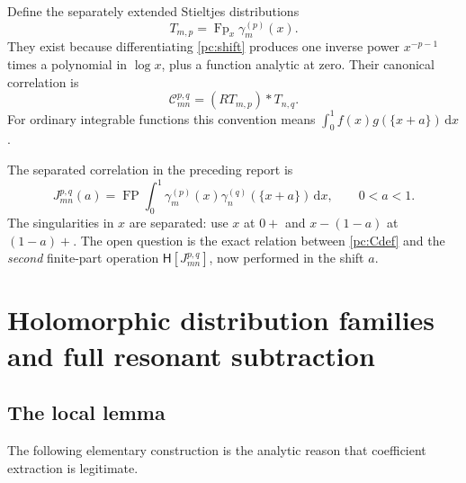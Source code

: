 \documentclass[11pt,a4paper]{article}
\numberwithin{equation}{section}
\theoremstyle{definition}
\newcommand{\dd}{\,\mathrm d}
\newcommand{\FP}{\operatorname{FP}}
\newcommand{\Fp}{\operatorname{Fp}}
\newcommand{\HH}{\mathsf H}
\newcommand{\CC}{\mathcal C}
\begin{document}
Define the separately extended Stieltjes distributions
\begin{equation}\label{pc:Tdef}
T_{m,p}=\Fp_x\gamma_m^{(p)}(x).
\end{equation}
They exist because differentiating \eqref{pc:shift} produces one inverse power $x^{-p-1}$ times a polynomial in $\log x$, plus a function analytic at zero. Their canonical correlation is
\begin{equation}\label{pc:Cdef}
\CC_{mn}^{p,q}=(RT_{m,p})*T_{n,q}.
\end{equation}
For ordinary integrable functions this convention means $\int_0^1f(x)g(\{x+a\})\dd x$.

The separated correlation in the preceding report is
\begin{equation}\label{pc:Jdef}
J_{mn}^{p,q}(a)=\FP\int_0^1
\gamma_m^{(p)}(x)\gamma_n^{(q)}(\{x+a\})\dd x,
\qquad 0<a<1.
\end{equation}
The singularities in $x$ are separated: use $x$ at $0+$ and $x-(1-a)$ at $(1-a)+$. The open question is the exact relation between \eqref{pc:Cdef} and the \emph{second} finite-part operation $\HH[J_{mn}^{p,q}]$, now performed in the shift $a$.

\section{Holomorphic distribution families and full resonant subtraction}\label{pc:families}
\subsection{The local lemma}
The following elementary construction is the analytic reason that coefficient extraction is legitimate.
\end{document}
